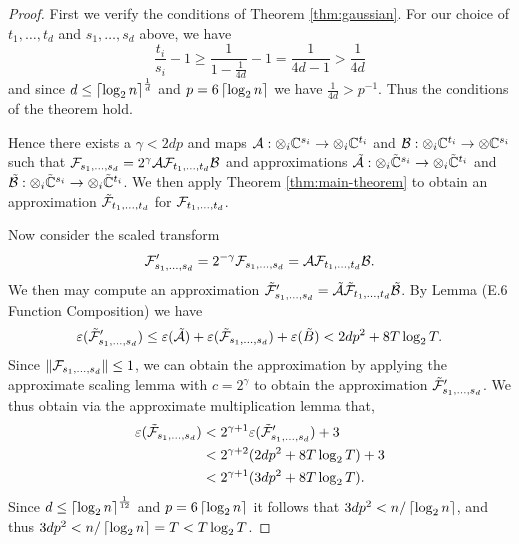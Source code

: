 \begin{proof}
    First we verify the conditions of Theorem \ref{thm:gaussian}. For our choice of $t_1, \ldots, t_d$ and $s_1, \ldots, s_d$ above, we have
    \[
        \frac{t_i}{s_i} - 1 \ge \frac{1}{1 - \frac{1}{4d}} - 1 = \frac{1}{4d - 1} > \frac{1}{4d}
    \]
    and since $d \le \left \lceil \log_2 n \right \rceil^{\frac{1}{d}}$ and $p = 6\left \lceil \log_2 n \right \rceil$ we have $\frac{1}{4d} > p^{-1}$. Thus the conditions of the theorem hold.

    Hence there exists a $\gamma < 2dp$ and maps $\mathcal A: \otimes_i {\mathbb C}^{s_i} \to \otimes_i {\mathbb C}^{t_i}$ and $\mathcal B: \otimes_i {\mathbb C}^{t_i} \to \otimes {\mathbb C}^{s_i}$ such that $\mathcal F_{s_1, \ldots, s_d} = 2^\gamma \mathcal A\mathcal F_{t_1, \ldots, t_d} \mathcal B$ and approximations $\tilde{\mathcal A}: \otimes_i \tilde{{\mathbb C}}^{s_i} \to \otimes_i \tilde{{\mathbb C}}^{t_i}$ and $\tilde{\mathcal B}: \otimes_i \tilde{{\mathbb C}}^{s_i} \to \otimes_i \tilde{{\mathbb C}}^{t_i}$. We then apply Theorem \ref{thm:main-theorem} to obtain an approximation $\tilde{\mathcal F}_{t_1, \ldots, t_d}$ for $\mathcal F_{t_1, \ldots, t_d}$.

    Now consider the scaled transform
    \[
        \mathcal F^\prime_{s_1, \ldots, s_d} = 2^{-\gamma} \mathcal F_{s_1, \ldots, s_d} = \mathcal A\mathcal F_{t_1, \ldots, t_d}\mathcal B.
    \]
    We then may compute an approximation $\tilde{\mathcal F}^\prime_{s_1, \ldots, s_d} = \tilde{\mathcal A}\tilde{\mathcal F}_{t_1, \ldots, t_d}\tilde{\mathcal B}$. By Lemma (E.6 Function Composition) we have
    \[
        \varepsilon(\tilde{\mathcal F}^\prime_{s_1, \ldots, s_d}) \le \varepsilon(\tilde{\mathcal A}) + \varepsilon(\tilde{\mathcal F}_{s_1, \ldots, s_d}) + \varepsilon(\tilde{B}) < 2dp^2 + 8T\log_2 T.
    \]
    Since $\|\mathcal F_{s_1, \ldots, s_d}\| \le 1$, we can obtain the approximation by applying the approximate scaling lemma with $c =  2^\gamma$ to obtain the approximation $\tilde{\mathcal F}_{s_1, \ldots, s_d}^\prime$. We thus obtain via the approximate multiplication lemma that,
    \begin{align*}
        \varepsilon(\tilde{\mathcal F}_{s_1, \ldots, s_d}) &< 2^{\gamma + 1} \varepsilon(\tilde{\mathcal F}_{s_1, \ldots, s_d}^\prime) + 3\\
                                                      &< 2^{\gamma + 2}(2dp^2 + 8T \log_2 T) + 3\\
                                                      &< 2^{\gamma + 1}(3dp^2 + 8T\log_2 T).
    \end{align*}
    Since $d \le \left \lceil \log_2 n \right \rceil^{\frac{1}{12}}$ and $p = 6\left \lceil \log_2 n \right \rceil$ it follows that $3dp^2 < n / \left \lceil \log_2 n \right \rceil$, and thus $3dp^2 < n / \left \lceil \log_2 n \right \rceil = T < T \log _2 T$.


\end{proof}
